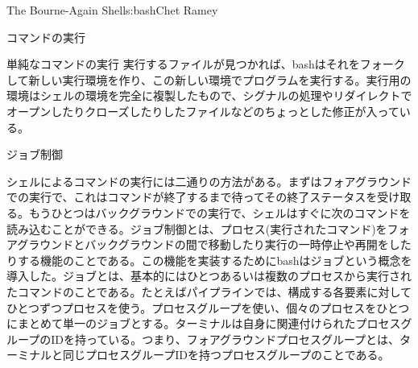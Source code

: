 \begin{aosachapter}{The Bourne-Again Shell}{s:bash}{Chet Ramey}
\begin{aosasect1}{コマンドの実行}
\begin{aosasect2}{単純なコマンドの実行}
実行するファイルが見つかれば、bashはそれをフォークして新しい実行環境を作り、この新しい環境でプログラムを実行する。実行用の環境はシェルの環境を完全に複製したもので、シグナルの処理やリダイレクトでオープンしたりクローズしたりしたファイルなどのちょっとした修正が入っている。

\end{aosasect2}

\begin{aosasect2}{ジョブ制御}

シェルによるコマンドの実行には二通りの方法がある。まずはフォアグラウンドでの実行で、これはコマンドが終了するまで待ってその終了ステータスを受け取る。もうひとつはバックグラウンドでの実行で、シェルはすぐに次のコマンドを読み込むことができる。ジョブ制御とは、プロセス(実行されたコマンド)をフォアグラウンドとバックグラウンドの間で移動したり実行の一時停止や再開をしたりする機能のことである。この機能を実装するためにbashはジョブという概念を導入した。ジョブとは、基本的にはひとつあるいは複数のプロセスから実行されたコマンドのことである。たとえばパイプラインでは、構成する各要素に対してひとつずつプロセスを使う。プロセスグループを使い、個々のプロセスをひとつにまとめて単一のジョブとする。ターミナルは自身に関連付けられたプロセスグループのIDを持っている。つまり、フォアグラウンドプロセスグループとは、ターミナルと同じプロセスグループIDを持つプロセスグループのことである。


\end{aosasect2}
\end{aosasect1}
\end{aosachapter}
